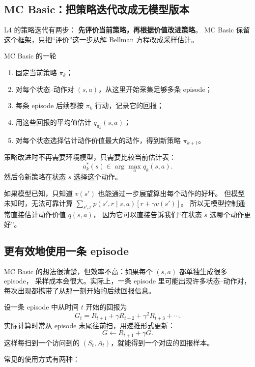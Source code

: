 \documentclass[11pt,a4paper,fontset=fandol]{ctexart}
\begin{document}
\subsection{MC Basic：把策略迭代改成无模型版本}

L4 的策略迭代有两步：
\textbf{先评价当前策略，再根据价值改进策略}。
MC Basic 保留这个框架，只把“评价”这一步从解 Bellman 方程改成采样估计。

\begin{goalbox}{MC Basic 的一轮}
\begin{enumerate}
  \item 固定当前策略 \(\pi_k\)；
  \item 对每个状态--动作对 \((s,a)\)，从这里开始采集足够多条 episode；
  \item 每条 episode 后续都按 \(\pi_k\) 行动，记录它的回报；
  \item 用这些回报的平均值估计 \(q_{\pi_k}(s,a)\)；
  \item 对每个状态选择估计动作价值最大的动作，得到新策略 \(\pi_{k+1}\)。
\end{enumerate}
\end{goalbox}

策略改进时不再需要环境模型，只需要比较当前估计表：
\[
a_k^*(s)\in\arg\max_a \hat q_k(s,a).
\]
然后令新策略在状态 \(s\) 选择这个动作。

\begin{warningbox}
如果模型已知，只知道 \(v(s')\) 也能通过一步展望算出每个动作的好坏。
但模型未知时，无法可靠计算
\(\sum_{s',r}p(s',r\mid s,a)[r+\gamma v(s')]\)。
所以无模型控制通常直接估计动作价值 \(q(s,a)\)，
因为它可以直接告诉我们“在状态 \(s\) 选哪个动作更好”。
\end{warningbox}

\subsection{更有效地使用一条 episode}

MC Basic 的想法很清楚，但效率不高：如果每个 \((s,a)\) 都单独生成很多 episode，
采样成本会很大。实际上，一条 episode 里可能出现许多状态--动作对，
每次出现都携带了从那一刻开始的后续回报信息。

设一条 episode 中从时间 \(t\) 开始的回报为
\[
G_t=R_{t+1}+\gamma R_{t+2}+\gamma^2R_{t+3}+\cdots.
\]
实际计算时常从 episode 末尾往前扫，用递推形式更新：
\[
G\leftarrow R_{t+1}+\gamma G.
\]
这样每扫到一个访问到的 \((S_t,A_t)\)，就能得到一个对应的回报样本。

常见的使用方式有两种：
\end{document}
